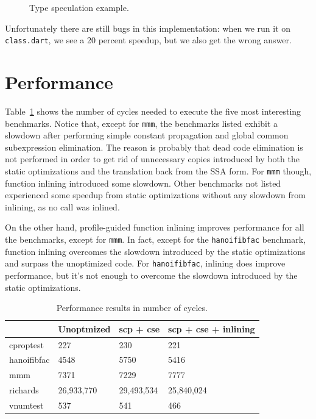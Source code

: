 \documentclass[10pt,twocolumn]{article}
\begin{document}
\begin{figure}
\begin{center}
\begin{minipage}{0.95\columnwidth}
  \caption{\label{fig:hammock} Type speculation example.}
\end{minipage}
\end{center}
\end{figure}

Unfortunately there are still bugs in this implementation: when we run
it on \texttt{class.dart}, we see a 20 percent speedup, but we also get the
wrong answer.

\section{Performance}

Table~\ref{results} shows the number of cycles needed to execute the five
most interesting benchmarks. Notice that, except for \texttt{mmm}, the benchmarks listed exhibit a slowdown
after performing simple constant propagation and global common subexpression elimination.
The reason is probably that dead code elimination is not performed in order
to get rid of unnecessary copies introduced by both the static optimizations and the translation
back from the SSA form. For \texttt{mmm} though, function inlining introduced some slowdown.
Other benchmarks not listed experienced some speedup from static optimizations without any
slowdown from inlining, as no call was inlined.

On the other hand, profile-guided function inlining improves performance for all the benchmarks, except for \texttt{mmm}.
In fact, except for the \texttt{hanoifibfac} benchmark, function inlining overcomes the slowdown
introduced by the static optimizations and surpass the unoptimized code. For \texttt{hanoifibfac}, inlining does improve
performance, but it's not enough to overcome the slowdown introduced by the static optimizations.

\begin{table}[b]
\begin{tabular}{|l|l|l|l|} \hline
~           & \textbf{Unoptmized} & \textbf{scp + cse}  & \textbf{scp + cse + inlining} \\ \hline
cproptest   & 227        & 230        & 221                  \\ \hline
hanoifibfac & 4548       & 5750       & 5416                 \\ \hline
mmm         & 7371       & 7229       & 7777                 \\ \hline
richards    & 26,933,770 & 29,493,534 & 25,840,024           \\ \hline
vnumtest    & 537        & 541        & 466                  \\ \hline
\end{tabular}
\caption{Performance results in number of cycles.}
\label{results}
\end{table}
\end{document}
